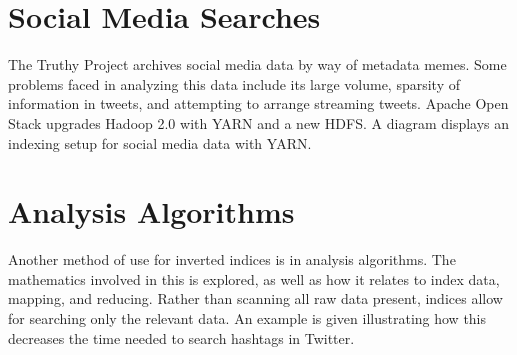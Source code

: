 

\section{Social Media Searches}

The Truthy Project archives social media data by way of metadata memes.
Some problems faced in analyzing this data include its large volume,
sparsity of information in tweets, and attempting to arrange streaming
tweets. Apache Open Stack upgrades Hadoop 2.0 with YARN and a new HDFS.
A diagram displays an indexing setup for social media data with YARN.



\section{Analysis Algorithms}

Another method of use for inverted indices is in analysis algorithms.
The mathematics involved in this is explored, as well as how it relates
to index data, mapping, and reducing. Rather than scanning all raw data
present, indices allow for searching only the relevant data. An example
is given illustrating how this decreases the time needed to search
hashtags in Twitter.



